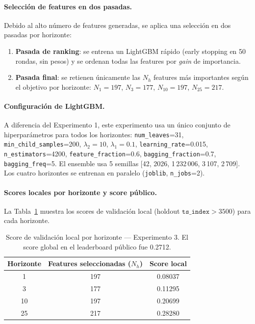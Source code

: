 \documentclass{article}
\begin{document}
\paragraph{Selección de features en dos pasadas.}
Debido al alto número de features generadas, se aplica una selección en dos pasadas por horizonte:
\begin{enumerate}
    \item \textbf{Pasada de ranking}: se entrena un LightGBM rápido (early stopping en 50 rondas, sin pesos) y se ordenan todas las features por \emph{gain} de importancia.
    \item \textbf{Pasada final}: se retienen únicamente las $N_h$ features más importantes según el objetivo por horizonte: $N_1 = 197$, $N_3 = 177$, $N_{10} = 197$, $N_{25} = 217$.
\end{enumerate}

\paragraph{Configuración de LightGBM.}
A diferencia del Experimento 1, este experimento usa un único conjunto de hiperparámetros para todos los horizontes: \texttt{num\_leaves}=31, \texttt{min\_child\_samples}=200, $\lambda_2=10$, $\lambda_1=0.1$, \texttt{learning\_rate}=0.015, \texttt{n\_estimators}=4200, \texttt{feature\_fraction}=0.6, \texttt{bagging\_fraction}=0.7, \texttt{bagging\_freq}=5. El ensemble usa 5 semillas [42, 2026, 1\,232\,006, 3\,107, 2\,709]. Los cuatro horizontes se entrenan en paralelo (\texttt{joblib}, \texttt{n\_jobs}=2).

\paragraph{Scores locales por horizonte y score público.}
La Tabla~\ref{tab:horizon_scores_exp3} muestra los scores de validación local (holdout $\texttt{ts\_index} > 3500$) para cada horizonte.

\begin{table}[h!]
  \caption{Score de validación local por horizonte — Experimento 3. El score global en el leaderboard público fue 0.2712.}
  \label{tab:horizon_scores_exp3}
  \centering
  \begin{tabular}{ccc}
    \toprule
    Horizonte & Features seleccionadas ($N_h$) & Score local \\
    \midrule
    1  & 197 & 0.08037 \\
    3  & 177 & 0.11295 \\
    10 & 197 & 0.20699 \\
    25 & 217 & 0.28280 \\
    \bottomrule
  \end{tabular}
\end{table}
\end{document}
